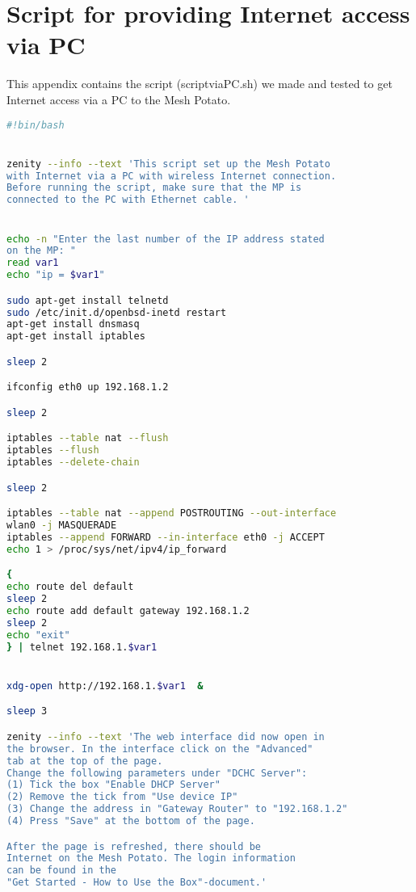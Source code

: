 \chapter{Script for providing Internet access via PC}
\label{chp:appendixD} 

This appendix contains the script (scriptviaPC.sh) we made and tested to get Internet access via a PC to the Mesh Potato.  

\begin{framed}
\noindent
\lstset{showstringspaces=false}
\begin{lstlisting}[language=sh]
#!bin/bash


zenity --info --text 'This script set up the Mesh Potato 
with Internet via a PC with wireless Internet connection. 
Before running the script, make sure that the MP is
connected to the PC with Ethernet cable. '


echo -n "Enter the last number of the IP address stated
on the MP: "
read var1 
echo "ip = $var1"

sudo apt-get install telnetd
sudo /etc/init.d/openbsd-inetd restart
apt-get install dnsmasq
apt-get install iptables 

sleep 2

ifconfig eth0 up 192.168.1.2

sleep 2

iptables --table nat --flush
iptables --flush
iptables --delete-chain

sleep 2

iptables --table nat --append POSTROUTING --out-interface
wlan0 -j MASQUERADE
iptables --append FORWARD --in-interface eth0 -j ACCEPT
echo 1 > /proc/sys/net/ipv4/ip_forward

{
echo route del default
sleep 2
echo route add default gateway 192.168.1.2 
sleep 2
echo "exit"
} | telnet 192.168.1.$var1 


xdg-open http://192.168.1.$var1  &

sleep 3

zenity --info --text 'The web interface did now open in 
the browser. In the interface click on the "Advanced" 
tab at the top of the page. 
Change the following parameters under "DCHC Server": 
(1) Tick the box "Enable DHCP Server"
(2) Remove the tick from "Use device IP"
(3) Change the address in "Gateway Router" to "192.168.1.2"
(4) Press "Save" at the bottom of the page. 

After the page is refreshed, there should be 
Internet on the Mesh Potato. The login information 
can be found in the 
"Get Started - How to Use the Box"-document.'

\end{lstlisting}
\end{framed}

